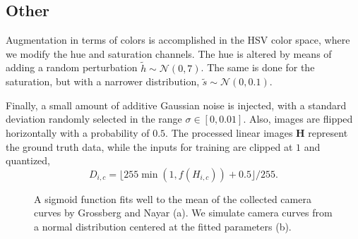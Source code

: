 \documentclass[acmtog]{acmart}
\newcommand{\vect}[1]{\boldsymbol{#1}}
\newcommand{\hdrp}{H}
\newcommand{\ldrp}{D}
\newcommand{\hdr}{\vect{\hdrp}}
\newcommand{\cc}{f}
\newcommand\customsection[1]{\subsection{#1}}
\begin{document}
\customsection{Other}
Augmentation in terms of colors is accomplished in the HSV color space, where we modify the hue and saturation channels. The hue is altered by means of adding a random perturbation $\tilde{h} \sim \mathcal{N}(0,7)$. The same is done for the saturation, but with a narrower distribution, $\tilde{s} \sim \mathcal{N}(0,0.1)$.

Finally, a small amount of additive Gaussian noise is injected, with a standard deviation randomly selected in the range $\sigma\in[0,0.01]$. Also, images are flipped horizontally with a probability of $0.5$. The processed linear images $\hdr$ represent the ground truth data, while the inputs for training are clipped at $1$ and quantized, 
\begin{equation}
\ldrp_{i,c} = \lfloor 255 \min(1,\cc(\hdrp_{i,c})) + 0.5 \rfloor / 255.
\label{eqn:clip}
\end{equation}

\begin{figure}
	\centering
	\vspace{-2pt}
	\vspace{-5pt}
	\caption{\label{fig:cc} A sigmoid function fits well to the mean of the collected camera curves by Grossberg and Nayar \citeyear{Grossberg2003} (a). We simulate camera curves from a normal distribution centered at the fitted parameters (b).}
\end{figure}
 
 
\end{document}
